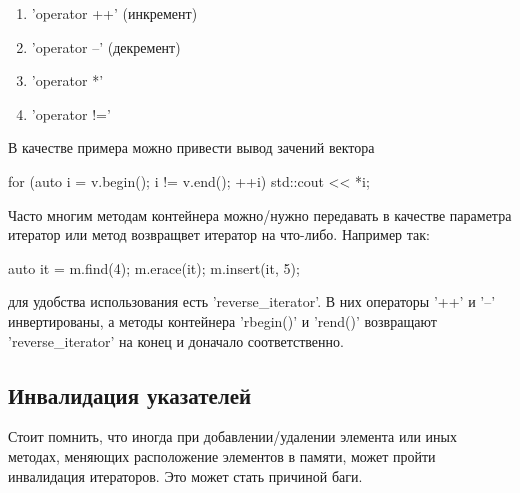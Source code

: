 \begin{enumerate}
	\item \cpp'operator ++' (инкремент)
	\item \cpp'operator --' (декремент)
	\item \cpp'operator *'
	\item \cpp'operator !='
\end{enumerate}

В качестве примера можно привести вывод зачений вектора
\begin{cppcode}
for (auto i = v.begin(); i != v.end(); ++i) {
	std::cout << *i;
}
\end{cppcode}

Часто многим методам контейнера можно/нужно передавать в качестве параметра итератор или метод возвращвет итератор на что-либо. Например так:
\begin{cppcode}
auto it = m.find(4);
m.erace(it);
m.insert(it, 5);
\end{cppcode}
для удобства использования есть \cpp'reverse_iterator'. В них операторы \cpp'++' и \cpp'--' инвертированы, 
а методы контейнера \cpp'rbegin()' и \cpp'rend()' возвращают \cpp'reverse_iterator' на конец и доначало соответственно.

\subsection{Инвалидация указателей}

Стоит помнить, что иногда при добавлении/удалении элемента или иных методах, меняющих расположение элементов в памяти, может пройти инвалидация итераторов. Это может стать причиной баги.